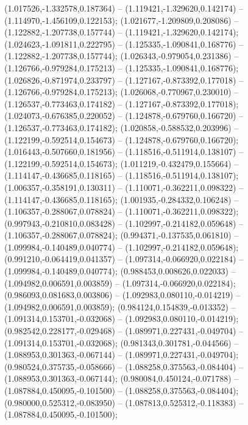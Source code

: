  (1.017526,-1.332578,0.187364) -- (1.119421,-1.329620,0.142174) -- (1.114970,-1.456109,0.122153);
 (1.021677,-1.209809,0.208086) -- (1.122882,-1.207738,0.157744) -- (1.119421,-1.329620,0.142174);
 (1.024623,-1.091811,0.222795) -- (1.125335,-1.090841,0.168776) -- (1.122882,-1.207738,0.157744);
 (1.026343,-0.979054,0.231386) -- (1.126766,-0.979284,0.175213) -- (1.125335,-1.090841,0.168776);
 (1.026826,-0.871974,0.233797) -- (1.127167,-0.873392,0.177018) -- (1.126766,-0.979284,0.175213);
 (1.026068,-0.770967,0.230010) -- (1.126537,-0.773463,0.174182) -- (1.127167,-0.873392,0.177018);
 (1.024073,-0.676385,0.220052) -- (1.124878,-0.679760,0.166720) -- (1.126537,-0.773463,0.174182);
 (1.020858,-0.588532,0.203996) -- (1.122199,-0.592514,0.154673) -- (1.124878,-0.679760,0.166720);
 (1.016443,-0.507660,0.181956) -- (1.118516,-0.511914,0.138107) -- (1.122199,-0.592514,0.154673);
 (1.011219,-0.432479,0.155664) -- (1.114147,-0.436685,0.118165) -- (1.118516,-0.511914,0.138107);
 (1.006357,-0.358191,0.130311) -- (1.110071,-0.362211,0.098322) -- (1.114147,-0.436685,0.118165);
 (1.001935,-0.284332,0.106248) -- (1.106357,-0.288067,0.078824) -- (1.110071,-0.362211,0.098322);
 (0.997943,-0.210810,0.083428) -- (1.102997,-0.214182,0.059648) -- (1.106357,-0.288067,0.078824);
 (0.994371,-0.137535,0.061810) -- (1.099984,-0.140489,0.040774) -- (1.102997,-0.214182,0.059648);
 (0.991210,-0.064419,0.041357) -- (1.097314,-0.066920,0.022184) -- (1.099984,-0.140489,0.040774);
 (0.988453,0.008626,0.022033) -- (1.094982,0.006591,0.003859) -- (1.097314,-0.066920,0.022184);
 (0.986093,0.081683,0.003806) -- (1.092983,0.080110,-0.014219) -- (1.094982,0.006591,0.003859);
 (0.984124,0.154839,-0.013352) -- (1.091314,0.153701,-0.032068) -- (1.092983,0.080110,-0.014219);
 (0.982542,0.228177,-0.029468) -- (1.089971,0.227431,-0.049704) -- (1.091314,0.153701,-0.032068);
 (0.981343,0.301781,-0.044566) -- (1.088953,0.301363,-0.067144) -- (1.089971,0.227431,-0.049704);
 (0.980524,0.375735,-0.058666) -- (1.088258,0.375563,-0.084404) -- (1.088953,0.301363,-0.067144);
 (0.980084,0.450124,-0.071788) -- (1.087884,0.450095,-0.101500) -- (1.088258,0.375563,-0.084404);
 (0.980000,0.525312,-0.083950) -- (1.087813,0.525312,-0.118383) -- (1.087884,0.450095,-0.101500);
